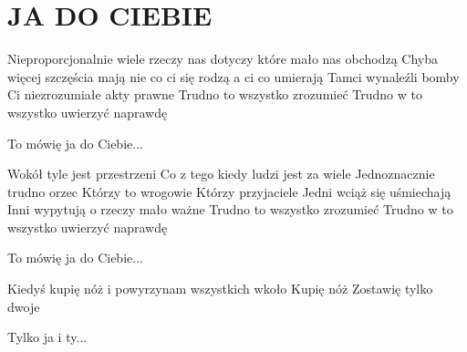 \documentclass[../../../songbook.tex]{subfiles}
\begin{document}
\TabPositions{8cm} %
\section*{JA DO CIEBIE}
{}
\vspace{0.5cm}
Nieproporcjonalnie wiele rzeczy nas dotyczy	 \newline
które mało nas obchodzą				\newline
Chyba więcej szczęścia mają				\newline
nie co ci się rodzą						\newline
a ci co umierają						\newline
Tamci wynaleźli bomby					 \newline
Ci niezrozumiałe akty prawne				 \newline
Trudno to wszystko zrozumieć				 \newline
Trudno w to wszystko uwierzyć naprawdę		 \newline

\-\hspace{1cm} To mówię ja do Ciebie...		 \newline

Wokół tyle jest przestrzeni					\newline
Co z tego kiedy ludzi jest za wiele				\newline
Jednoznacznie trudno orzec				\newline
Którzy to wrogowie				\newline
Którzy przyjaciele				\newline
Jedni wciąż się uśmiechają				\newline
Inni wypytują o rzeczy mało ważne				\newline
Trudno to wszystko zrozumieć				\newline
Trudno w to wszystko uwierzyć naprawdę				\newline

\-\hspace{1cm} To mówię ja do Ciebie...				\newline

Kiedyś kupię nóż i powyrzynam wszystkich wkoło 		 \newline
Kupię nóż								 \newline
Zostawię tylko dwoje						\newline

\-\hspace{1cm} Tylko ja i ty...			\newline
\end{document}
